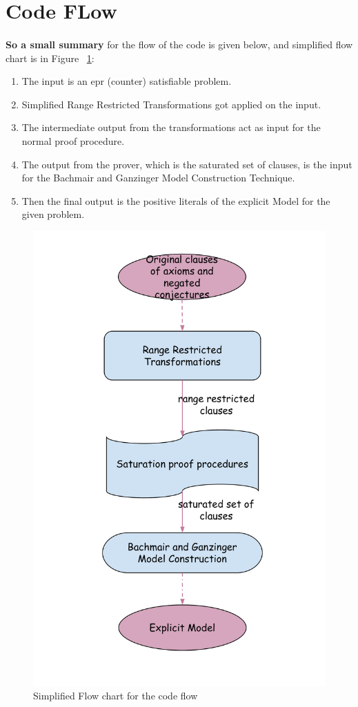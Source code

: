 \section{Code FLow}\label{sec:c3s3}
	
	\paragraph{}
	\textbf{So a small summary} for the flow of the code is given below, and simplified flow chart is in Figure ~\ref{fig:simplified_code_flow}:
		
		\begin{enumerate}
			\item The input is an \ac{epr} (counter) satisfiable problem.
			\item Simplified Range Restricted Transformations got applied on the input.
			\item The intermediate output from the transformations act as input for the normal proof procedure.
			\item The output from the prover, which is the saturated set of clauses, is the input for the Bachmair and Ganzinger Model Construction Technique. 
			\item Then the final output is the positive literals of the explicit Model for the given problem.  
		\end{enumerate}
		
		
		\begin{figure}[H]
			\centering
			\includegraphics[scale=0.42]{pictures/simplified_code_flow.pdf}
			\caption{Simplified Flow chart for the code flow\label{fig:simplified_code_flow}}
		\end{figure}
		
	